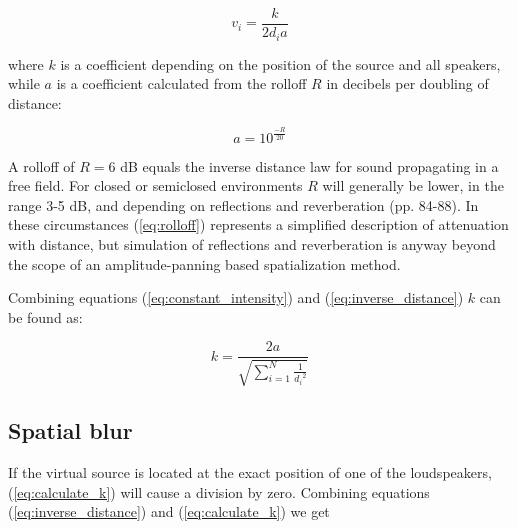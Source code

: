 \documentclass[twoside,10pt]{article}
\begin{document}
\begin{equation} \label{eq:inverse_distance}
v_{i} = \frac{k}{2 d_{i} a} 
\end{equation}

where $k$ is a coefficient depending on the position of the source and all speakers, while $a$ is a coefficient calculated from the rolloff $R$ in decibels per doubling of distance:

\begin{equation} \label{eq:rolloff}
	a = 10^{\frac{-R}{20}}
\end{equation}

A rolloff of $R = 6$ dB equals the inverse distance law for sound propagating in a free field. For closed or semiclosed environments $R$ will generally be lower, in the range 3-5 dB, and depending on reflections and reverberation \cite{Everest:2000handbook_acoustics} (pp. 84-88). In these circumstances (\ref{eq:rolloff}) represents a simplified description of attenuation with distance, but simulation of reflections and reverberation is anyway beyond the scope of an amplitude-panning based spatialization method.


Combining equations (\ref{eq:constant_intensity}) and (\ref{eq:inverse_distance}) $k$ can be found as:

\begin{equation} \label{eq:calculate_k}
k = \frac{2a}{\sqrt{\sum_{i=1}^{N} \frac{1}{{d_{i}}^2}}}
\end{equation}




\subsection{Spatial blur}

If the virtual source is located at the exact position of one of the loudspeakers, (\ref{eq:calculate_k}) will cause a division by zero. Combining equations (\ref{eq:inverse_distance}) and (\ref{eq:calculate_k}) we get
\end{document}
